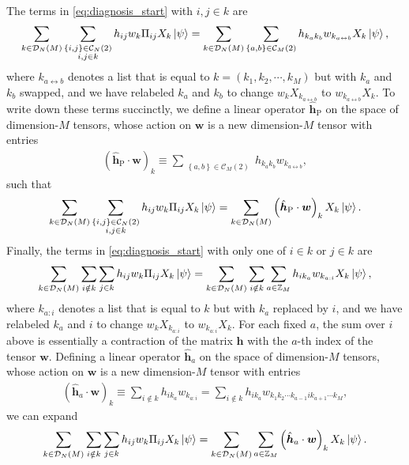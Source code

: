 \documentclass[nofootinbib,notitlepage,11pt]{revtex4-2}
\renewcommand{\t}{\text} %
\newcommand{\p}[1]{\left(#1\right)} %
\renewcommand{\set}[1]{\left\{#1\right\}} %
\renewcommand{\c}{\cdot} %
\newcommand{\m}{\bm} %
\newcommand{\1}{\mathds{1}}
\renewcommand{\i}{\mathrm{i}\mkern1mu}
\newcommand{\C}{\mathcal{C}}
\newcommand{\D}{\mathcal{D}}
\newcommand{\ZZ}{\mathbb{Z}}
\newcommand{\lra}{\leftrightarrow}
\begin{document}
The terms in \eqref{eq:diagnosis_start} with $i,j\in k$ are
\begin{align}
  \sum_{k\in\D_N\p{M}} \sum_{\substack{\set{i,j}\in\C_N\p{2}\\i,j\in k}}
  h_{ij} w_k \Pi_{ij} X_k \ket\psi
  = \sum_{k\in\D_N\p{M}} \sum_{\substack{\set{a,b}\in\C_M\p{2}}}
  h_{k_ak_b} w_{k_{a\lra b}} X_k \ket\psi,
\end{align}
where $k_{a\lra b}$ denotes a list that is equal to $k=\p{k_1,k_2,\cdots,k_M}$ but with $k_a$ and $k_b$ swapped, and we have relabeled $k_a$ and $k_b$ to change $w_k X_{k_{a\lra b}}$ to $w_{k_{a\lra b}} X_k$.
To write down these terms succinctly, we define a linear operator $\hat{\m h}_{\t{P}}$ on the space of dimension-$M$ tensors, whose action on $\m w$ is a new dimension-$M$ tensor with entries
\begin{align}
  \p{\hat{\m h}_{\t{P}} \c \m w}_k
  \equiv \sum_{\substack{\set{a,b}\in\C_M\p{2}}}
  h_{k_ak_b} w_{k_{a\lra b}},
  \label{eq:multi_body_op_perm}
\end{align}
such that
\begin{align}
  \sum_{k\in\D_N\p{M}} \sum_{\substack{\set{i,j}\in\C_N\p{2}\\i,j\in k}}
  h_{ij} w_k \Pi_{ij} X_k \ket\psi
  = \sum_{k\in\D_N\p{M}} \p{\hat{\m h}_{\t{P}} \c \m w}_k X_k \ket\psi.
\end{align}
Finally, the terms in \eqref{eq:diagnosis_start} with only one of $i\in k$ or $j\in k$ are
\begin{align}
  \sum_{k\in\D_N\p{M}} \sum_{i\notin k} \sum_{j\in k}
  h_{ij} w_k \Pi_{ij} X_k \ket\psi
  = \sum_{k\in\D_N\p{M}} \sum_{i\notin k}
  \sum_{a\in\ZZ_M} h_{ik_a} w_{k_{a:i}} X_k \ket\psi,
\end{align}
where $k_{a:i}$ denotes a list that is equal to $k$ but with $k_a$ replaced by $i$, and we have relabeled $k_a$ and $i$ to change $w_k X_{k_{a:i}}$ to $w_{k_{a:i}} X_k$.
For each fixed $a$, the sum over $i$ above is essentially a contraction of the matrix $\m h$ with the $a$-th index of the tensor $\m w$.
Defining a linear operator $\hat{\m h}_a$ on the space of dimension-$M$ tensors, whose action on $\m w$ is a new dimension-$M$ tensor with entries
\begin{align}
  \p{\hat{\m h}_a\c\m w}_k
  \equiv \sum_{i\notin k} h_{ik_a} w_{k_{a:i}}
  = \sum_{i\notin k}
  h_{ik_a} w_{k_1 k_2 \cdots k_{a-1} i k_{a+1} \cdots k_M},
  \label{eq:multi_body_op_contract}
\end{align}
we can expand
\begin{align}
  \sum_{k\in\D_N\p{M}} \sum_{i\notin k} \sum_{j\in k}
  h_{ij} w_k \Pi_{ij} X_k \ket\psi
  = \sum_{k\in\D_N\p{M}} \sum_{a\in\ZZ_M}
  \p{\hat{\m h}_a\c\m w}_k X_k \ket\psi.
\end{align}
\end{document}

